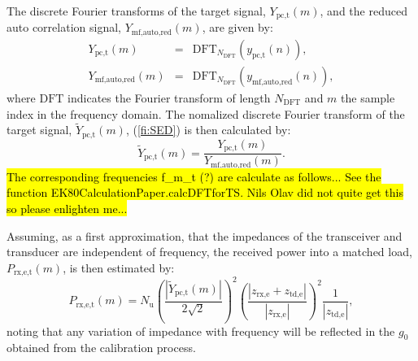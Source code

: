 \documentclass[preprint,12pt,TurnOnLineNumbers]{JASAnew}
\newcommand{\samplesymt}{n}
\newcommand{\samplesymf}{m}
\newcommand{\nchannels}{N_{\textrm{u}}}
\newcommand{\zrxe}{z_{\textrm{rx,e}}}
\newcommand{\ztde}{z_{\textrm{td,e}}}
\newcommand{\ypctarget}{y_{\textrm{pc,t}}}
\newcommand{\ymfautored}{y_{\textrm{mf,auto,red}}}
\newcommand{\ypctargetf}{Y_{\textrm{pc,t}}}
\newcommand{\ypctargetnormf}{\tilde{Y}_{\textrm{pc,t}}}
\newcommand{\ymfautoredf}{Y_{\textrm{mf,auto,red}}}
\newcommand{\prxetf}{P_{\textrm{rx,e,t}}}
\newcommand{\gainzero}{g_0}
\newcommand{\dft}{\textrm{DFT}}
\newcommand{\ndft}{{N_{\textrm{DFT}}}}
\begin{document}
The discrete Fourier transforms of the target signal, $\ypctargetf(\samplesymf)$, and the reduced auto correlation signal, $\ymfautoredf(\samplesymf)$, are given by:
\begin{eqnarray}
\label{eq:DFT_Target_Auto}
\ypctargetf(\samplesymf) & = & \dft_\ndft(\ypctarget(\samplesymt)),\\
\ymfautoredf(\samplesymf) & = & \dft_\ndft(\ymfautored(\samplesymt)),
\end{eqnarray}
where $\dft$ indicates the Fourier transform of length $\ndft$ and $\samplesymf$ the sample index in the frequency domain.
The nomalized discrete Fourier transform of the target signal, $\ypctargetnormf(\samplesymf)$, (\ref{fi:SED}) is then calculated by: 
%
\begin{equation}
\label{eq:DFT_Target_Auto_Norm}
\ypctargetnormf(\samplesymf) = \frac{\ypctargetf(\samplesymf)} {\ymfautoredf(\samplesymf)}.
\end{equation}
%
\hl{The corresponding frequencies f\_m\_t (?) are calculate as follows... See the function EK80CalculationPaper.calcDFTforTS. Nils Olav did not quite get this so please enlighten me...}

Assuming, as a first approximation, that the impedances of the transceiver and transducer are independent of frequency, the received power into a matched load, $\prxetf(\samplesymf)$, is then estimated by:
\begin{equation}
\label{eq:prx_FFT_target}
\prxetf(\samplesymf) = \nchannels\left( \frac{|\ypctargetnormf(\samplesymf)|}{2\sqrt{2}} \right)^2 
\left( \frac{|\zrxe+\ztde|}{|\zrxe|}\right)^2 \frac{1}{|\ztde|}, %
\end{equation}
%
noting that any variation of impedance with frequency will be reflected in the $\gainzero$ obtained from the calibration process.
\end{document}
